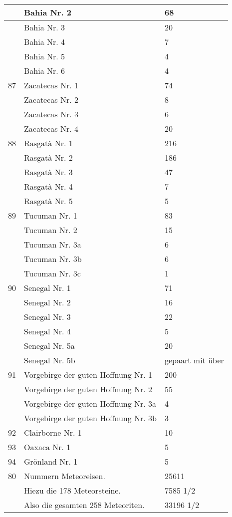 \documentclass[a4paper, 11pt, oneside, polutonikogreek, german]{article}
\begin{document}
\begin{center}
\begin{longtable}{|l|l|l|}
          & Bahia Nr. 2 & 68 \\ \hline
          & Bahia Nr. 3 & 20 \\ \hline
          & Bahia Nr. 4 & 7 \\ \hline
          & Bahia Nr. 5 & 4 \\ \hline
          & Bahia Nr. 6 & 4 \\ \hline
        87 & Zacatecas Nr. 1 & 74 \\ \hline
          & Zacatecas Nr. 2 & 8 \\ \hline
          & Zacatecas Nr. 3 & 6 \\ \hline
          & Zacatecas Nr. 4 & 20 \\ \hline
        88 & Rasgatà Nr. 1 & 216 \\ \hline
          & Rasgatà Nr. 2 & 186 \\ \hline
          & Rasgatà Nr. 3 & 47 \\ \hline
          & Rasgatà Nr. 4 & 7 \\ \hline
          & Rasgatà Nr. 5 & 5 \\ \hline
        89 & Tucuman Nr. 1 & 83 \\ \hline
          & Tucuman Nr. 2 & 15 \\ \hline
          & Tucuman Nr. 3a & 6 \\ \hline
          & Tucuman Nr. 3b & 6 \\ \hline
          & Tucuman Nr. 3c & 1 \\ \hline
        90 & Senegal Nr. 1 & 71 \\ \hline
          & Senegal Nr. 2 & 16 \\ \hline
          & Senegal Nr. 3 & 22 \\ \hline
          & Senegal Nr. 4 & 5 \\ \hline
          & Senegal Nr. 5a & 20 \\ \hline
          & Senegal Nr. 5b & gepaart mit über \\ \hline
        91 & Vorgebirge der guten Hoffnung Nr. 1 & 200 \\ \hline
          & Vorgebirge der guten Hoffnung Nr. 2 & 55 \\ \hline
          & Vorgebirge der guten Hoffnung Nr. 3a & 4 \\ \hline
          & Vorgebirge der guten Hoffnung Nr. 3b & 3 \\ \hline
        92 & Clairborne Nr. 1 & 10 \\ \hline
        93 & Oaxaca Nr. 1 & 5 \\ \hline
        94 & Grönland Nr. 1 & 5 \\ \hline
        80 & Nummern Meteoreisen. & 25611 \\ \hline
          & Hiezu die 178 Meteorsteine. & 7585 1/2 \\ \hline
          & Also die gesamten 258 Meteoriten. & 33196 1/2 \\ \hline
    \end{longtable}
\end{center}
\clearpage
\end{document}
